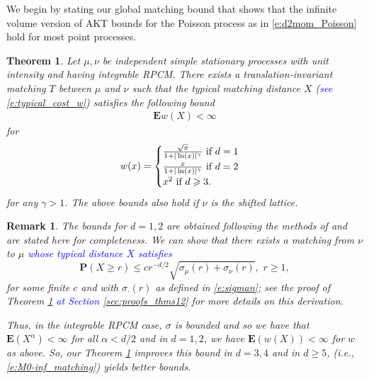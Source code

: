 \documentclass[12pt]{article}
\newtheorem{theorem}{Theorem}
\newtheorem{remark}{Remark}
\newcommand{\1}{\mathbf{1}}
\newcommand{\E}{\mathbf  E}
\newcommand{\pr}{\mathbf  P}
\newcommand{\RL}[1]{\textcolor{blue}{#1}}
\newcommand{\dy}[1]{\textcolor{blue}{#1}}
\newcommand{\RL}[1]{#1}%
\newcommand{\dy}[1]{#1}%
\renewcommand{\footnote}[1]{}
\begin{document}
{{{We begin by stating our global matching bound that shows that the infinite volume version of AKT bounds for the Poisson process as in \eqref{e:d2mom_Poisson} hold for most point processes}.
%
\begin{theorem}
\label{thm:std}
 Let $ \mu ,\nu $ be independent {simple} stationary processes  with unit intensity and having integrable RPCM.  There exists a translation-invariant matching $T$ between $\mu$ and $\nu$ such that the typical matching distance $X$ (\dy{see  \eqref{e:typical_cost_w}}) satisfies the following bound
\begin{align*}
\mathbf{E}w( X  )<\infty
\end{align*} for
\begin{align*}
w(x)=
\begin{cases}
\frac{ \sqrt{x}}{1+ | \ln(x) | ^{\gamma }}$  if $d= 1\\
\frac{ x}{1+ | \ln(x) | ^{\gamma }}$  if $d= 2\\
x^{2}$  if $d\geqslant 3.
 \end{cases}
\end{align*}
{for any} $\gamma > 1$. {The above bounds also hold if $\nu$ is the shifted lattice.}
%
\end{theorem}
%
%
\begin{remark}
\label{r:HPPS_comparison}
The bounds for $d=1,2$ are obtained following the methods of \cite[Theorem 1(ii)]{holroyd2009poisson} and are stated here for completeness.  {  We} can show that there exists a matching from $\nu$ to $\mu$  \RL{whose typical distance $ X$ satisfies}%
\begin{equation}
\label{e:M0-inf_matching}
 \pr(X \geqslant  r) \leqslant cr^{-d/2} \sqrt{\sigma_{\mu}(r) + \sigma_{\nu}(r)}, \, \, r \geq 1,
\end{equation}
%
for some finite $ c$ and with
 $\sigma_{\cdot}(r)$ as defined in \eqref{e:sigman}; {see the proof of Theorem \ref{thm:std} \RL{at Section  \ref{sec:proofs_thms12}} for more details on this derivation.}

Thus, in the integrable RPCM case, $\sigma $ is bounded and so we have that $\E(X^{\alpha}) < \infty$ for all $\alpha < d/2$ and in $d =1,2$, we have $\E(w (X)) < \infty$ for $w $ as above.   So, our Theorem \ref{thm:std} improves this bound in $d  = 3,4$ and in $d \geq 5$, \cite[Theorem 1(ii)]{holroyd2009poisson} (i.e., \eqref{e:M0-inf_matching}) yields better bounds.
\end{remark}

}}
\end{document}
